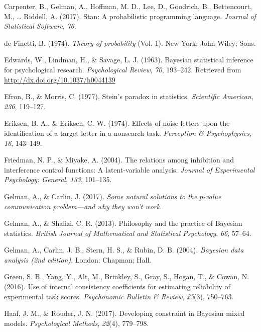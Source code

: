 \documentclass[english,man]{apa6}
\theoremstyle{definition}
\theoremstyle{definition}
\theoremstyle{remark}
\begin{document}
\hypertarget{ref-Carpenter:etal:2017}{}
Carpenter, B., Gelman, A., Hoffman, M. D., Lee, D., Goodrich, B.,
Bettencourt, M., \ldots{} Riddell, A. (2017). Stan: A probabilistic
programming language. \emph{Journal of Statistical Software}, \emph{76}.

\hypertarget{ref-deFinetti:1974}{}
de Finetti, B. (1974). \emph{Theory of probability} (Vol. 1). New York:
John Wiley; Sons.

\hypertarget{ref-Edwards:etal:1963}{}
Edwards, W., Lindman, H., \& Savage, L. J. (1963). Bayesian statistical
inference for psychological research. \emph{Psychological Review},
\emph{70}, 193--242. Retrieved from
\url{http://dx.doi.org/10.1037/h0044139}

\hypertarget{ref-Efron:Morris:1977}{}
Efron, B., \& Morris, C. (1977). Stein's paradox in statistics.
\emph{Scientific American}, \emph{236}, 119--127.

\hypertarget{ref-Eriksen:Eriksen:1974}{}
Eriksen, B. A., \& Eriksen, C. W. (1974). Effects of noise letters upon
the identification of a target letter in a nonsearch task.
\emph{Perception \& Psychophysics}, \emph{16}, 143--149.

\hypertarget{ref-Friedman:Miyake:2004}{}
Friedman, N. P., \& Miyake, A. (2004). The relations among inhibition
and interference control functions: A latent-variable analysis.
\emph{Journal of Experimental Psychology: General}, \emph{133},
101--135.

\hypertarget{ref-Gelman:Carlin:2017}{}
Gelman, A., \& Carlin, J. (2017). \emph{Some natural solutions to the
\(p\)-value communication problem---and why they won't work}.

\hypertarget{ref-Gelman:Shalizi:2013}{}
Gelman, A., \& Shalizi, C. R. (2013). Philosophy and the practice of
Bayesian statistics. \emph{British Journal of Mathematical and
Statistical Psychology}, \emph{66}, 57--64.

\hypertarget{ref-Gelman:etal:2004}{}
Gelman, A., Carlin, J. B., Stern, H. S., \& Rubin, D. B. (2004).
\emph{Bayesian data analysis (2nd edition)}. London: Chapman; Hall.

\hypertarget{ref-Green:etal:2016}{}
Green, S. B., Yang, Y., Alt, M., Brinkley, S., Gray, S., Hogan, T., \&
Cowan, N. (2016). Use of internal consistency coefficients for
estimating reliability of experimental task scores. \emph{Psychonomic
Bulletin \& Review}, \emph{23}(3), 750--763.

\hypertarget{ref-Haaf:Rouder:2017}{}
Haaf, J. M., \& Rouder, J. N. (2017). Developing constraint in Bayesian
mixed models. \emph{Psychological Methods}, \emph{22}(4), 779--798.
\end{document}
